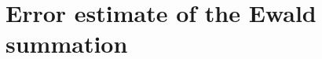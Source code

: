 \documentclass[aps,pre,preprint]{revtex4}
\begin{document}






\newpage
\appendix
\section{Error estimate of the Ewald summation}




\newpage

{}

\end{document}
